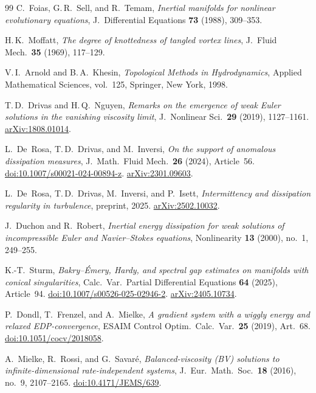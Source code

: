 \documentclass[12pt,a4paper]{article}
\theoremstyle{definition}
\theoremstyle{plain}
\theoremstyle{remark}
\begin{document}
\begin{thebibliography}{99}
C.~Foias, G.\,R.~Sell, and R.~Temam,
\emph{Inertial manifolds for nonlinear evolutionary equations},
J.~Differential Equations \textbf{73} (1988), 309--353.

H.\,K.~Moffatt,
\emph{The degree of knottedness of tangled vortex lines},
J.~Fluid Mech.\ \textbf{35} (1969), 117--129.

V.\,I.~Arnold and B.\,A.~Khesin,
\emph{Topological Methods in Hydrodynamics},
Applied Mathematical Sciences, vol.~125,
Springer, New York, 1998.

T.\,D.~Drivas and H.\,Q.~Nguyen,
\emph{Remarks on the emergence of weak Euler solutions in the vanishing
viscosity limit},
J.~Nonlinear Sci.\ \textbf{29} (2019), 1127--1161.
\href{https://arxiv.org/abs/1808.01014}{arXiv:1808.01014}.

L.~De~Rosa, T.\,D.~Drivas, and M.~Inversi,
\emph{On the support of anomalous dissipation measures},
J.~Math.\ Fluid Mech.\ \textbf{26} (2024), Article~56.
\href{https://doi.org/10.1007/s00021-024-00894-z}{doi:10.1007/s00021-024-00894-z}.
\href{https://arxiv.org/abs/2301.09603}{arXiv:2301.09603}.

L.~De~Rosa, T.\,D.~Drivas, M.~Inversi, and P.~Isett,
\emph{Intermittency and dissipation regularity in turbulence},
preprint, 2025.
\href{https://arxiv.org/abs/2502.10032}{arXiv:2502.10032}.

J.~Duchon and R.~Robert,
\emph{Inertial energy dissipation for weak solutions of incompressible Euler and Navier--Stokes equations},
Nonlinearity \textbf{13} (2000), no.~1, 249--255.

K.-T.~Sturm,
\emph{Bakry--\'Emery, Hardy, and spectral gap estimates on manifolds with conical singularities},
Calc.\ Var.\ Partial Differential Equations \textbf{64} (2025), Article~94.
\href{https://doi.org/10.1007/s00526-025-02946-2}{doi:10.1007/s00526-025-02946-2}.
\href{https://arxiv.org/abs/2405.10734}{arXiv:2405.10734}.

P.~Dondl, T.~Frenzel, and A.~Mielke,
\emph{A gradient system with a wiggly energy and relaxed EDP-convergence},
ESAIM Control Optim.\ Calc.\ Var.\ \textbf{25} (2019), Art.~68.
\href{https://doi.org/10.1051/cocv/2018058}{doi:10.1051/cocv/2018058}.

A.~Mielke, R.~Rossi, and G.~Savar\'e,
\emph{Balanced-viscosity (BV) solutions to infinite-dimensional rate-independent systems},
J.~Eur.\ Math.\ Soc.\ \textbf{18} (2016), no.~9, 2107--2165.
\href{https://doi.org/10.4171/JEMS/639}{doi:10.4171/JEMS/639}.


\end{thebibliography}
\end{document}
